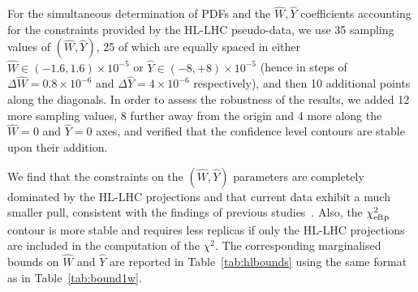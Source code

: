 \documentclass[withindex,glossary]{cam-thesis}
\begin{document}
\noindent For the simultaneous determination of PDFs and the $\hat{W},\hat{Y}$ coefficients
accounting for the constraints provided by the HL-LHC pseudo-data,
we use 35 sampling values of $(\hat{W},\hat{Y})$, 25 of which are equally spaced in
either $\hat{W}\in (-1.6,1.6)\times 10^{-5}$ or $\hat{Y}\in (-8,+8)\times 10^{-5}$
(hence in steps of $\Delta\hat{W}=0.8 \times 10^{-6}$ and
$\Delta\hat{Y}=4 \times 10^{-6}$ respectively), and then 10 additional points along the
diagonals.
%
In order to assess the robustness of the results, we added 12
more sampling values, 8 further away from the origin and 4 more along
the $\hat{W}=0$ and $\hat{Y}=0$ axes, and verified that the confidence
level contours are stable upon their addition. 

We find that the constraints on the $(\hat{W},\hat{Y})$ parameters are completely
dominated by the HL-LHC projections and that current data exhibit a much
smaller pull, consistent with the findings of previous
studies~\cite{Farina:2016rws,Ricci:2020xre}. Also, the $\chi^2_{\rm
  eftp}$ contour is more stable and requires less replicas if only the HL-LHC projections
are included in the computation of the $\chi^2$.
%
The corresponding 
marginalised bounds on $\hat{W}$ and $\hat{Y}$
are reported in Table~\ref{tab:hlbounds} using the same
format as in  Table~\ref{tab:bound1w}.
\end{document}
